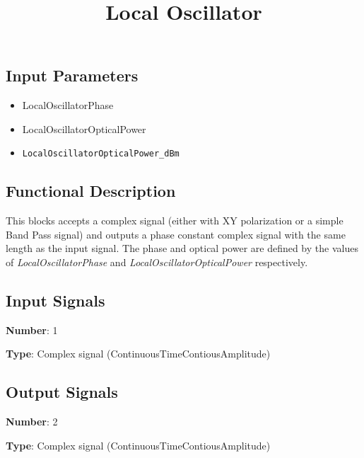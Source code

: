 \documentclass[a4paper]{article}
\title{Local Oscillator}
\begin{document}
\maketitle

\subsection*{Input Parameters}

\begin{multicols}{2}
	\begin{itemize}
		\item LocalOscillatorPhase
		\item LocalOscillatorOpticalPower
		\item \verb|LocalOscillatorOpticalPower_dBm|
	\end{itemize}
\end{multicols}

\subsection*{Functional Description}

This blocks accepts a complex signal (either with XY polarization or a simple Band Pass signal) and outputs a phase constant complex signal with the same length as the input signal. The phase and optical power are defined by the values of \textit{LocalOscillatorPhase} and \textit{LocalOscillatorOpticalPower} respectively.

\subsection*{Input Signals}

\textbf{Number}: 1

\textbf{Type}: Complex signal (ContinuousTimeContiousAmplitude)

\subsection*{Output Signals}

\textbf{Number}: 2

\textbf{Type}: Complex signal (ContinuousTimeContiousAmplitude)
\end{document}
